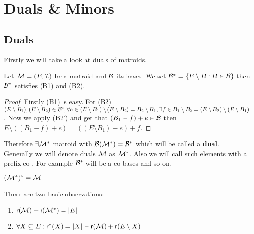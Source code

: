 \chapter{Duals \& Minors}

\section{Duals}

Firstly we will take a look at duals of matroids.

\begin{claim}
	Let $\mathcal{M} = (E, \mathcal{I})$ be a matroid and $\mathcal{B}$ its bases. We set $\mathcal{B}^{\ast} = \{E \setminus B : B \in \mathcal{B}\}$ then $\mathcal{B}^{\ast}$ satisfies (B1) and (B2).
\end{claim}

\begin{proof}
	Firstly (B1) is easy. For (B2) $(E \setminus B_1), (E \setminus B_2) \in \mathcal{B}^{\ast}, \forall e \in (E \setminus B_1) \setminus (E \setminus B_2) = B_2 \setminus B_1, \exists f \in B_1 \setminus B_2 = (E \setminus B_2) \setminus (E \setminus B_1)$. Now we apply (B2') and get that $(B_1 - f) + e \in \mathcal{B}$ then $E \setminus ((B_1 -f) +e) =((E \setminus B_1) -e ) + f$.
\end{proof}

Therefore $\exists \mathcal{M}^{\ast}$ matroid with $\mathcal{B}(\mathcal{M}^{\ast}) = \mathcal{B}^{\ast}$ which will be called a \textbf{dual}. Generally we will denote duals $\mathcal{M}$ as $\mathcal{M}^{\ast}$. Also we will call such elements with a prefix co-. For example $\mathcal{B}^{\ast}$ will be a co-bases and so on.

\begin{observ}
	$(\mathcal{M}^{\ast})^{\ast} = \mathcal{M}$
\end{observ}

\begin{prop}
	There are two basic observations:
	
	\begin{enumerate}
		\item $\operatorname{\textsf{r}}(\mathcal{M}) + \operatorname{\textsf{r}}(\mathcal{M}^{\ast}) = |E|$
		\item $\forall X \subseteq E : \operatorname{\textsf{r}}^{\ast}(X) = |X| - \operatorname{\textsf{r}}(\mathcal{M}) + \operatorname{\textsf{r}}(E \setminus X)$
	\end{enumerate}
	\label{rank-prop}
\end{prop}

